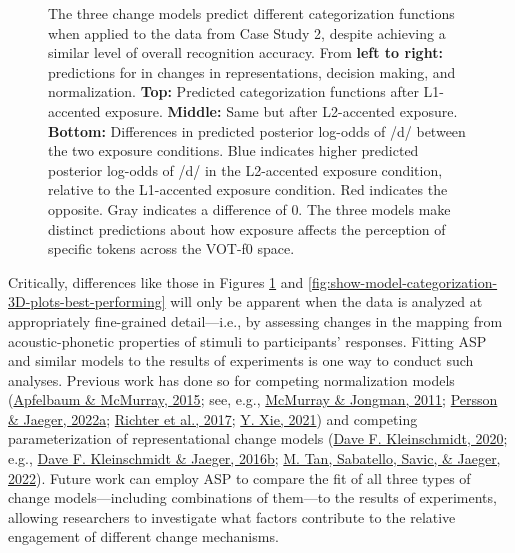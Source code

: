 \documentclass[
  11pt,
  english,
  man,floatsintext]{apa6}
\begin{document}
\begin{figure}
{}

\caption{The three change models predict different categorization functions when applied to the data from Case Study 2, despite achieving a similar level of overall recognition accuracy. From \textbf{left to right:} predictions for in changes in representations, decision making, and normalization. \textbf{Top:} Predicted categorization functions after L1-accented exposure. \textbf{Middle:} Same but after L2-accented exposure. \textbf{Bottom:} Differences in predicted posterior log-odds of /d/ between the two exposure conditions. Blue indicates higher predicted posterior log-odds of /d/ in the L2-accented exposure condition, relative to the L1-accented exposure condition. Red indicates the opposite. Gray indicates a difference of 0. The three models make distinct predictions about how exposure affects the perception of specific tokens across the VOT-f0 space.}\label{fig:show-model-categorization-3D-plots-similar-accuracy}
\end{figure}



Critically, differences like those in Figures \ref{fig:show-model-categorization-3D-plots-similar-accuracy} and \ref{fig:show-model-categorization-3D-plots-best-performing} will only be apparent when the data is analyzed at appropriately fine-grained detail---i.e., by assessing changes in the mapping from acoustic-phonetic properties of stimuli to participants' responses. Fitting ASP and similar models to the results of experiments is one way to conduct such analyses. Previous work has done so for competing normalization models (\protect\hyperlink{ref-apfelbaum-mcmurray2015}{Apfelbaum \& McMurray, 2015}; see, e.g., \protect\hyperlink{ref-mcmurray-jongman2011}{McMurray \& Jongman, 2011}; \protect\hyperlink{ref-persson-jaeger2022}{Persson \& Jaeger, 2022a}; \protect\hyperlink{ref-richter2017}{Richter et al., 2017}; \protect\hyperlink{ref-xie2021}{Y. Xie, 2021}) and competing parameterization of representational change models (\protect\hyperlink{ref-kleinschmidt2020}{Dave F. Kleinschmidt, 2020}; e.g., \protect\hyperlink{ref-kleinschmidt-jaeger2016cogsci}{Dave F. Kleinschmidt \& Jaeger, 2016b}; \protect\hyperlink{ref-tan2022}{M. Tan, Sabatello, Savic, \& Jaeger, 2022}). Future work can employ ASP to compare the fit of all three types of change models---including combinations of them---to the results of experiments, allowing researchers to investigate what factors contribute to the relative engagement of different change mechanisms.
\end{document}

